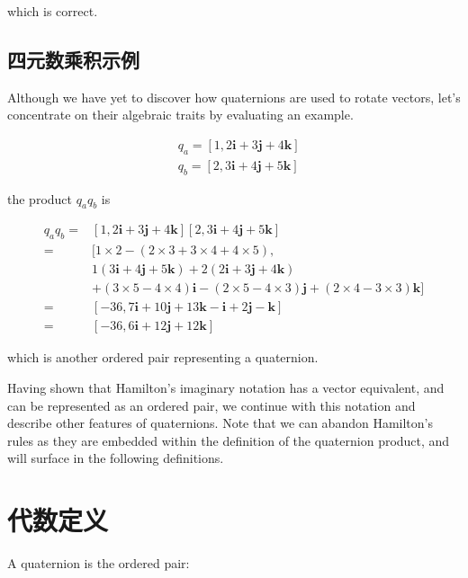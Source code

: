 which is correct.

\subsection{四元数乘积示例}
Although we have yet to discover how quaternions are used to rotate vectors, let's concentrate on their algebraic traits by evaluating an example.

$$
    \begin{aligned}
         & q_{a}=[1,2 \mathbf{i}+3 \mathbf{j}+4 \mathbf{k}] \\
         & q_{b}=[2,3 \mathbf{i}+4 \mathbf{j}+5 \mathbf{k}]
    \end{aligned}
$$

the product $q_{a} q_{b}$ is

$$
    \begin{aligned}
        q_{a} q_{b}= & {[1,2 \mathbf{i}+3 \mathbf{j}+4 \mathbf{k}][2,3 \mathbf{i}+4 \mathbf{j}+5 \mathbf{k}] }                    \\
        =            & {[1 \times 2-(2 \times 3+3 \times 4+4 \times 5),}                                                          \\
                     & 1(3 \mathbf{i}+4 \mathbf{j}+5 \mathbf{k})+2(2 \mathbf{i}+3 \mathbf{j}+4 \mathbf{k})                        \\
                     & +(3 \times 5-4 \times 4) \mathbf{i}-(2 \times 5-4 \times 3) \mathbf{j}+(2 \times 4-3 \times 3) \mathbf{k}] \\
        =            & {[-36,7 \mathbf{i}+10 \mathbf{j}+13 \mathbf{k}-\mathbf{i}+2 \mathbf{j}-\mathbf{k}] }                       \\
        =            & {[-36,6 \mathbf{i}+12 \mathbf{j}+12 \mathbf{k}] }
    \end{aligned}
$$

which is another ordered pair representing a quaternion.

Having shown that Hamilton's imaginary notation has a vector equivalent, and can be represented as an ordered pair, we continue with this notation and describe other features of quaternions. Note that we can abandon Hamilton's rules as they are embedded within the definition of the quaternion product, and will surface in the following definitions.

\section{代数定义}
A quaternion is the ordered pair:


